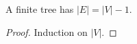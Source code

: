 \begin{theorem}
A finite tree has $|E| = |V| - 1$.
\end{theorem}

\begin{proof}
Induction on $|V|$.
\end{proof}
